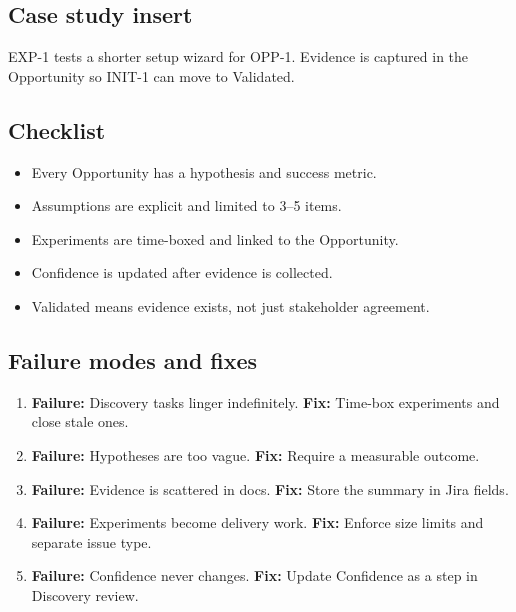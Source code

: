 \subsection{Case study insert}
EXP-1 tests a shorter setup wizard for OPP-1. Evidence is captured in the Opportunity so INIT-1 can move to Validated.
\subsection{Checklist}
\begin{itemize}
  \item Every Opportunity has a hypothesis and success metric.
  \item Assumptions are explicit and limited to 3--5 items.
  \item Experiments are time-boxed and linked to the Opportunity.
  \item Confidence is updated after evidence is collected.
  \item Validated means evidence exists, not just stakeholder agreement.
\end{itemize}

\subsection{Failure modes and fixes}
\begin{enumerate}
  \item \textbf{Failure:} Discovery tasks linger indefinitely. \textbf{Fix:} Time-box experiments and close stale ones.
  \item \textbf{Failure:} Hypotheses are too vague. \textbf{Fix:} Require a measurable outcome.
  \item \textbf{Failure:} Evidence is scattered in docs. \textbf{Fix:} Store the summary in Jira fields.
  \item \textbf{Failure:} Experiments become delivery work. \textbf{Fix:} Enforce size limits and separate issue type.
  \item \textbf{Failure:} Confidence never changes. \textbf{Fix:} Update Confidence as a step in Discovery review.
\end{enumerate}










